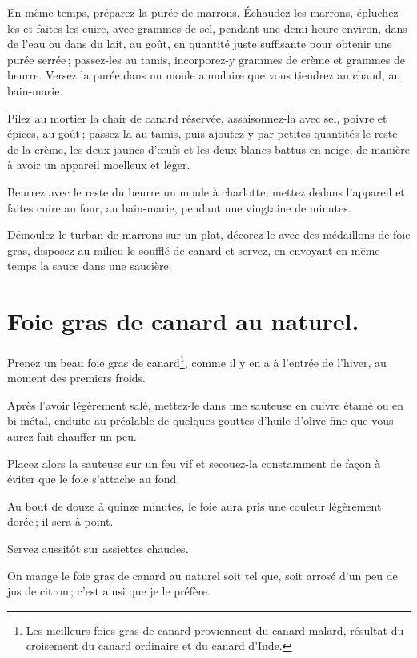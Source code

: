 En même temps, préparez la purée de marrons. Échaudez les marrons, épluchez-les
et faites-les cuire, avec {\mmm} grammes de sel, pendant une demi-heure
environ, dans de l’eau ou dans du lait, au goût, en quantité juste suffisante
pour obtenir une purée serrée ; passez-les au tamis, incorporez-y {\mmm}
grammes de crème et {\mmm} grammes de beurre. Versez la purée dans un
moule annulaire que vous tiendrez au chaud, au bain-marie.

Pilez au mortier la chair de canard réservée, assaisonnez-la avec sel, poivre
et épices, au goût ; passez-la au tamis, puis ajoutez-y par petites quantités
le reste de la crème, les deux jaunes d'œufs et les deux blancs battus en
neige, de manière à avoir un appareil moelleux et léger.

Beurrez avec le reste du beurre un moule à charlotte, mettez dedans l'appareil
et faites cuire au four, au bain-marie, pendant une vingtaine de minutes.

Démoulez le turban de marrons sur un plat, décorez-le avec des médaillons de
foie gras, disposez au milieu le soufflé de canard et servez, en envoyant en
même temps la sauce dans une saucière.

\section*{\centering Foie gras de canard au naturel.}
{}
\label{pg0592} \hypertarget{p0592}{}

Prenez un beau foie gras de canard\footnote{ Les meilleurs foies gras de canard
proviennent du canard malard, résultat du croisement du canard ordinaire et du
canard d'Inde.}, comme il y en a à l'entrée de l'hiver, au moment des premiers
froids.

Après l'avoir légèrement salé, mettez-le dans une sauteuse en cuivre étamé ou
en bi-métal, enduite au préalable de quelques gouttes d'huile d'olive fine que
vous aurez fait chauffer un peu.

Placez alors la sauteuse sur un feu vif et secouez-la constamment de façon à
éviter que le foie s'attache au fond.

Au bout de douze à quinze minutes, le foie aura pris une couleur légèrement
dorée ; il sera à point.

Servez aussitôt sur assiettes chaudes.

On mange le foie gras de canard au naturel soit tel que, soit arrosé d'un peu
de jus de citron ; c'est ainsi que je le préfère.

